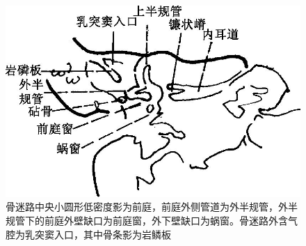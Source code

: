 \begin{figure}
{\begin{minipage}[b]{0.5\textwidth}
    \includegraphics{./images/Image00110.jpg}\\
    {\small 骨迷路中央小圆形低密度影为前庭，前庭外侧管道为外半规管，外半规管下的前庭外壁缺口为前庭窗，外下壁缺口为蜗窗。骨迷路外含气腔为乳突窦入口，其中骨条影为岩鳞板}
  \end{minipage}}
  \caption{}
  \label{fig4-1}
  \end{figure}

